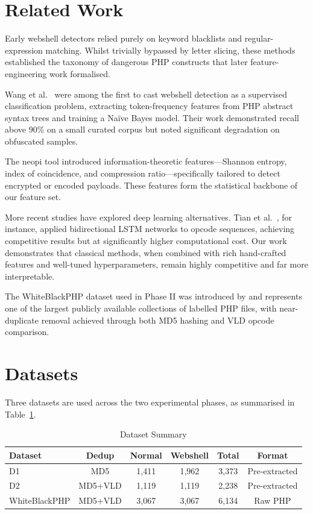 \documentclass[journal,twocolumn]{IEEEtran}
\begin{document}
\section{Related Work}

Early webshell detectors relied purely on keyword blacklists and regular-expression matching. Whilst trivially bypassed by letter slicing, these methods established the taxonomy of dangerous PHP constructs that later feature-engineering work formalised.

Wang et al.\ \cite{wang2012detecting} were among the first to cast webshell detection as a supervised classification problem, extracting token-frequency features from PHP abstract syntax trees and training a Na\"{i}ve Bayes model. Their work demonstrated recall above 90\% on a small curated corpus but noted significant degradation on obfuscated samples.

The neopi tool \cite{neopi2010} introduced information-theoretic features---Shannon entropy, index of coincidence, and compression ratio---specifically tailored to detect encrypted or encoded payloads. These features form the statistical backbone of our feature set.

More recent studies have explored deep learning alternatives. Tian et al.\ \cite{tian2020}, for instance, applied bidirectional LSTM networks to opcode sequences, achieving competitive results but at significantly higher computational cost. Our work demonstrates that classical methods, when combined with rich hand-crafted features and well-tuned hyperparameters, remain highly competitive and far more interpretable.

The WhiteBlackPHP dataset used in Phase II was introduced by \cite{dataset2022} and represents one of the largest publicly available collections of labelled PHP files, with near-duplicate removal achieved through both MD5 hashing and VLD opcode comparison.

\section{Datasets}

Three datasets are used across the two experimental phases, as summarised in Table~\ref{tab:datasets}.

\begin{table}[H]
\centering
\caption{Dataset Summary}
\label{tab:datasets}
\begin{tabular}{@{}lccccc@{}}
\toprule
Dataset & Dedup & Normal & Webshell & Total & Format \\
\midrule
D1 & MD5 & 1{,}411 & 1{,}962 & 3{,}373 & Pre-extracted \\
D2 & MD5+VLD & 1{,}119 & 1{,}119 & 2{,}238 & Pre-extracted \\
WhiteBlackPHP & MD5+VLD & 3{,}067 & 3{,}067 & 6{,}134 & Raw PHP \\
\bottomrule
\end{tabular}
\end{table}
\end{document}
